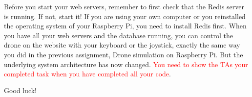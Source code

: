 \documentclass{article}
\begin{document}
\noindent Before you start your web servers, remember to first check that the Redis server is running. If not, start it! If you are using your own computer or you reinstalled the operating system of your Raspberry Pi, you need to install Redis first. When you have all your web servers and the database running, you can control the drone on the website with your keyboard or the joystick, exactly the same way you did in the previous assignment, Drone simulation on Raspberry Pi. But the underlying system architecture has now changed. {\textcolor{red}{You need to show the TAs your completed task when you have completed all your code}}.

\vspace{1cm}
\begin{center}
\huge Good luck!
\end{center}
\end{document}
